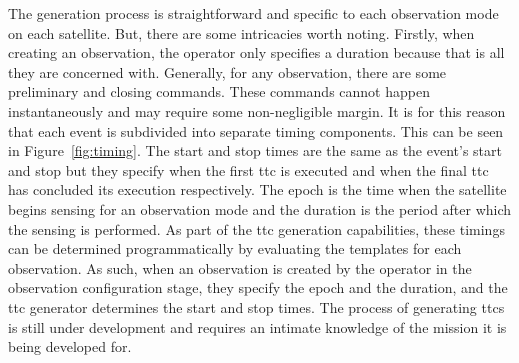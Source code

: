 The generation process is straightforward and specific to each observation mode
on each satellite. But, there are some intricacies worth noting. Firstly, when
creating an observation, the operator only specifies a duration because that is
all they are concerned with.  Generally, for any observation, there are some
preliminary and closing commands. These commands cannot happen instantaneously
and may require some non-negligible margin. It is for this reason that each
event is subdivided into separate timing components.  This can be seen in
Figure~\ref{fig:timing}. The start and stop times are the same as the event’s
start and stop but they specify when the first \gls{ttc} is executed and when
the final \gls{ttc} has concluded its execution respectively.  The epoch is the
time when the satellite begins sensing for an observation mode and the duration
is the period after which the sensing is performed. As part of the \gls{ttc}
generation capabilities, these timings can be determined programmatically by
evaluating the templates for each observation. As such, when an observation is
created by the operator in the observation configuration stage, they specify
the epoch and the duration, and the \gls{ttc} generator determines the start
and stop times. The process of generating \glspl{ttc} is still under
development and requires an intimate knowledge of the mission it is being
developed for. 




